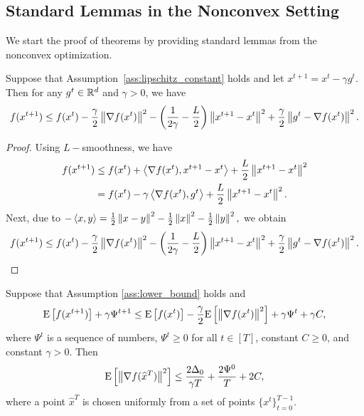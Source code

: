 \documentclass{article}
\begin{document}
\subsection{Standard Lemmas in the Nonconvex Setting}

We start the proof of theorems by providing standard lemmas from the nonconvex optimization.

\begin{lemma}
  \label{lemma:page_lemma}
  Suppose that Assumption~\ref{ass:lipschitz_constant} holds and let $x^{t+1} = x^{t} - \gamma g^{t}$. Then for any $g^{t} \in \mathbb{R}^d$ and $\gamma > 0$, we have
  \begin{eqnarray}
    \label{eq:page_lemma}
    f(x^{t + 1}) \leq f(x^t) - \frac{\gamma}{2}\left\| \nabla f(x^t) \right\|^2 - \left(\frac{1}{2\gamma} - \frac{L}{2}\right)
    \left\| x^{t+1} - x^t \right\|^2 + \frac{\gamma}{2}\left\| g^{t} - \nabla f(x^t) \right\|^2.
  \end{eqnarray}
\end{lemma}

\begin{proof}
  Using $L-$smoothness, we have 
  \begin{align*}
    f(x^{t+1}) &\leq f(x^t) + \left\langle\nabla f(x^t),x^{t+1} - x^{t}\right\rangle + \frac{L}{2} \left\| x^{t+1} - x^{t} \right\|^2 \\
    &= f(x^t) - \gamma \left\langle\nabla f(x^t),g^t\right\rangle + \frac{L}{2} \left\| x^{t+1} - x^{t} \right\|^2.
  \end{align*}
  Next, due to $-\left\langle x,y\right\rangle = \frac{1}{2}\left\| x - y \right\|^2 - \frac{1}{2}\left\| x \right\|^2 - \frac{1}{2}\left\| y \right\|^2,$ we obtain 
  \begin{align*}
    f(x^{t+1}) \leq f(x^t) -\frac{\gamma}{2} \left\| \nabla f(x^t) \right\|^2 - \left(\frac{1}{2\gamma} - \frac{L}{2}\right) \left\| x^{t+1} - x^{t} \right\|^2 + \frac{\gamma}{2}\left\| g^t - \nabla f(x^t) \right\|^2.
  \end{align*}
\end{proof}

\begin{lemma}
  \label{lemma:good_recursion}
  Suppose that Assumption \ref{ass:lower_bound} holds and
  \begin{align*}
      {\rm E}\left[f(x^{t+1})\right] + \gamma \Psi^{t+1} \leq {\rm E}\left[f(x^t)\right] - \frac{\gamma}{2}{\rm E}\left[\left\| \nabla f(x^t) \right\|^2\right] + \gamma \Psi^{t} + \gamma C,
  \end{align*}
  where $\Psi^{t}$ is a sequence of numbers, $\Psi^{t} \geq 0$ for all $t \in [T]$, constant $C \geq 0$, and constant $\gamma > 0.$ Then 
  \begin{align}
      \label{eq:good_recursion}
      {\rm E}\left[\left\| \nabla f(\widehat{x}^T) \right\|^2\right] \leq \frac{2 \Delta_0}{\gamma T} + \frac{2\Psi^{0}}{T} + 2 C,
  \end{align}
  where a point $\widehat{x}^T$ is chosen uniformly from a set of points $\{x^t\}_{t=0}^{T-1}.$
\end{lemma}
\end{document}
